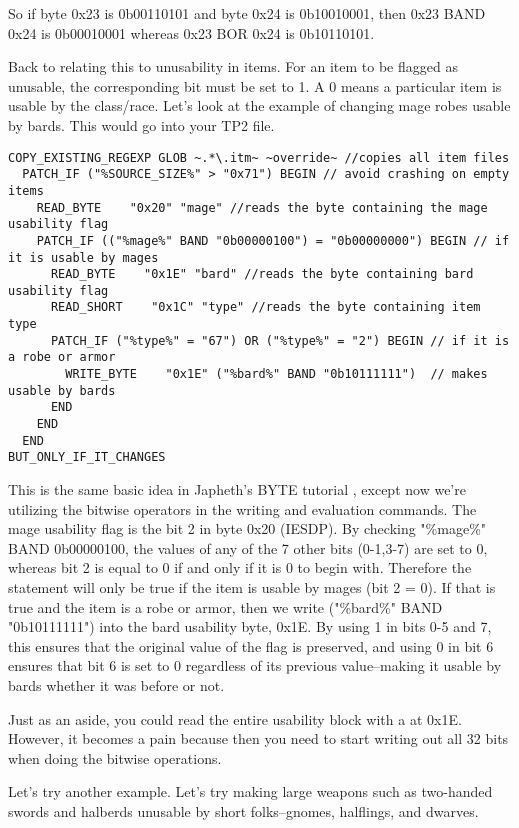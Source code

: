 \documentclass{article}
\def\ttref#1{\ahrefloc{#1}{\tt #1}}
\begin{document}
So if byte 0x23 is 0b00110101 and byte 0x24 is 0b10010001, then 0x23 BAND
0x24 is 0b00010001 whereas 0x23 BOR 0x24 is 0b10110101.

Back to relating this to unusability in items. For an item to be flagged as
unusable, the corresponding bit must be set to 1. A 0 means a particular
item is usable by the class/race. Let's look at the example of changing
mage robes usable by bards. This would go into your TP2 file.

\begin{verbatim}
COPY_EXISTING_REGEXP GLOB ~.*\.itm~ ~override~ //copies all item files
  PATCH_IF ("%SOURCE_SIZE%" > "0x71") BEGIN // avoid crashing on empty items
    READ_BYTE    "0x20" "mage" //reads the byte containing the mage usability flag
    PATCH_IF (("%mage%" BAND "0b00000100") = "0b00000000") BEGIN // if it is usable by mages
      READ_BYTE    "0x1E" "bard" //reads the byte containing bard usability flag
      READ_SHORT    "0x1C" "type" //reads the byte containing item type
      PATCH_IF ("%type%" = "67") OR ("%type%" = "2") BEGIN // if it is a robe or armor
        WRITE_BYTE    "0x1E" ("%bard%" BAND "0b10111111")  // makes usable by bards
      END
    END
  END
BUT_ONLY_IF_IT_CHANGES
\end{verbatim}

This is the same basic idea in Japheth's BYTE tutorial , except now we're
utilizing the bitwise operators in the writing and evaluation commands. The
mage usability flag is the bit 2 in byte 0x20 (IESDP). By checking "\%mage\%"
BAND 0b00000100, the values of any of the 7 other bits (0-1,3-7) are set to
0, whereas bit 2 is equal to 0 if and only if it is 0 to begin with.
Therefore the statement will only be true if the item is usable by mages
(bit 2 = 0). If that is true and the item is a robe or armor, then we write
("\%bard\%" BAND "0b10111111") into the bard usability byte, 0x1E. By using 1
in bits 0-5 and 7, this ensures that the original value of the flag is
preserved, and using 0 in bit 6 ensures that bit 6 is set to 0 regardless
of its previous value--making it usable by bards whether it was before or
not.

Just as an aside, you could read the entire usability block with a
\ttref{READ!LONG} at 0x1E. However, it becomes a pain because then you need
to start writing out all 32 bits when doing the bitwise operations.

Let's try another example. Let's try making large weapons such as
two-handed swords and halberds unusable by short folks--gnomes, halflings,
and dwarves.
\end{document}
